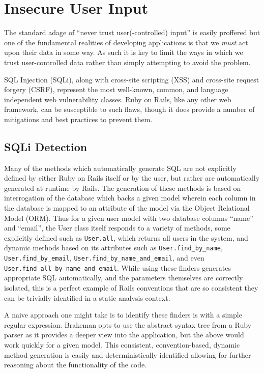 \documentclass[conference]{IEEEtran}
\begin{document}
\section{Insecure User Input}

The standard adage of ``never trust user(-controlled) input'' is easily
proffered but one of the fundamental realities of developing applications
is that we \emph{must} act upon their data in some way.  As such it is key to
limit the ways in which we trust user-controlled data rather than simply
attempting to avoid the problem.

SQL Injection (SQLi), along with cross-site scripting (XSS) and cross-site request forgery
(CSRF), represent the most well-known, common, and language independent web vulnerability
classes.  Ruby on Rails, like any other web framework, can be susceptible to such
flaws, though it does provide a number of mitigations and best practices to prevent them.

\subsection{SQLi Detection}

Many of the methods which automatically generate SQL are not explicitly defined
by either Ruby on Rails itself or by the user, but rather are automatically generated at
runtime by Rails.  The generation of these methods is based on interrogation of the
database which backs a given model wherein each column in the database is mapped to an
attribute of the model via the Object Relational Model (ORM).  Thus for a given user model
with two database columns ``name'' and ``email'', the User class itself responds to a
variety of methods, some explicitly defined such as \texttt{User.all}, which returns all
users in the system, and dynamic methods based on its attributes such as
\texttt{User.find\_by\_name}, \texttt{User.find\_by\_email},
\texttt{User.find\_by\_name\_and\_email}, and even
\texttt{User.find\_all\_by\_name\_and\_email}.  While using these finders generates
appropriate SQL automatically, and the parameters themselves are correctly isolated, this
is a perfect example of Rails conventions that are so consistent they can be trivially
identified in a static analysis context.

A naive approach one might take is to identify these finders is with a simple regular
expression.  Brakeman opts to use the abstract syntax tree from a Ruby parser as it
provides a deeper view into the application, but the above would work quickly for a given
model.  This consistent, convention-based, dynamic method generation is easily and
deterministically identified allowing for further reasoning about the functionality of the
code.
\end{document}
